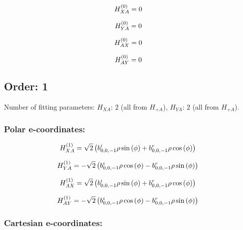 \documentclass[fleqn]{article}
\begin{document}
\begin{dmath*}
H_{XA}^{(0)}=0\\
\end{dmath*}

\begin{dmath*}
H_{YA}^{(0)}=0\\
\end{dmath*}

\begin{dmath*}
H_{AX}^{(0)}=0\\
\end{dmath*}

\begin{dmath*}
H_{AY}^{(0)}=0\\
\end{dmath*}
\subsection{Order: 1}
Number of fitting parameters: $H_{XA}$: $2$ (all from $H_{+A}$), $H_{YA}$: $2$ (all from $H_{+A}$).
\subsubsection*{Polar e-coordinates:}

\begin{dmath*}
H_{XA}^{(1)}=\sqrt{2} \left(b^{i}_{0,0,-1} \rho \sin{\left (\phi \right )} + b^{r}_{0,0,-1} \rho \cos{\left (\phi \right )}\right)\\
\end{dmath*}

\begin{dmath*}
H_{YA}^{(1)}=-  \sqrt{2} \left( b^{i}_{0,0,-1} \rho \cos{\left (\phi \right )} -  b^{r}_{0,0,-1} \rho \sin{\left (\phi \right )}\right)\\
\end{dmath*}

\begin{dmath*}
H_{AX}^{(1)}=\sqrt{2} \left(b^{i}_{0,0,-1} \rho \sin{\left (\phi \right )} + b^{r}_{0,0,-1} \rho \cos{\left (\phi \right )}\right)\\
\end{dmath*}

\begin{dmath*}
H_{AY}^{(1)}=-  \sqrt{2} \left( b^{i}_{0,0,-1} \rho \cos{\left (\phi \right )} -  b^{r}_{0,0,-1} \rho \sin{\left (\phi \right )}\right)\\
\end{dmath*}
\subsubsection*{Cartesian e-coordinates:}
\end{document}
